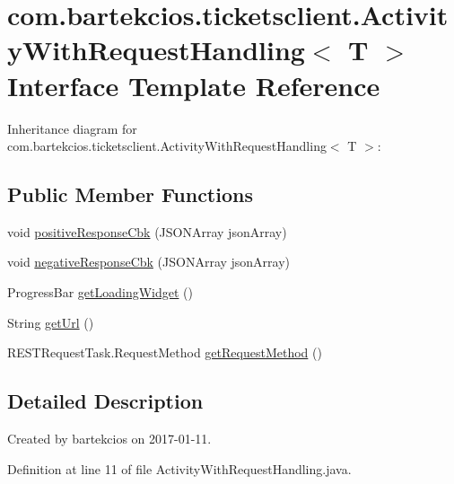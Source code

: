 \hypertarget{interfacecom_1_1bartekcios_1_1ticketsclient_1_1_activity_with_request_handling}{}\section{com.\+bartekcios.\+ticketsclient.\+Activity\+With\+Request\+Handling$<$ T $>$ Interface Template Reference}
\label{interfacecom_1_1bartekcios_1_1ticketsclient_1_1_activity_with_request_handling}


Inheritance diagram for com.\+bartekcios.\+ticketsclient.\+Activity\+With\+Request\+Handling$<$ T $>$\+:
\subsection*{Public Member Functions}
\begin{DoxyCompactItemize}
\item 
void \hyperlink{interfacecom_1_1bartekcios_1_1ticketsclient_1_1_activity_with_request_handling_a43459b5f0cede2697cc0c1e214462098}{positive\+Response\+Cbk} (J\+S\+O\+N\+Array json\+Array)
\item 
void \hyperlink{interfacecom_1_1bartekcios_1_1ticketsclient_1_1_activity_with_request_handling_a821409dd3783f82301349608daba40d5}{negative\+Response\+Cbk} (J\+S\+O\+N\+Array json\+Array)
\item 
Progress\+Bar \hyperlink{interfacecom_1_1bartekcios_1_1ticketsclient_1_1_activity_with_request_handling_a2f8df8eb56e9ff841af1d6ce4726fdad}{get\+Loading\+Widget} ()
\item 
String \hyperlink{interfacecom_1_1bartekcios_1_1ticketsclient_1_1_activity_with_request_handling_a6a0c2f3b1ec60ef01b6a6da8c3c54b18}{get\+Url} ()
\item 
R\+E\+S\+T\+Request\+Task.\+Request\+Method \hyperlink{interfacecom_1_1bartekcios_1_1ticketsclient_1_1_activity_with_request_handling_a2de28f325f2c3d3b71101b30227331fb}{get\+Request\+Method} ()
\end{DoxyCompactItemize}


\subsection{Detailed Description}
Created by bartekcios on 2017-\/01-\/11. 

Definition at line 11 of file Activity\+With\+Request\+Handling.\+java.



